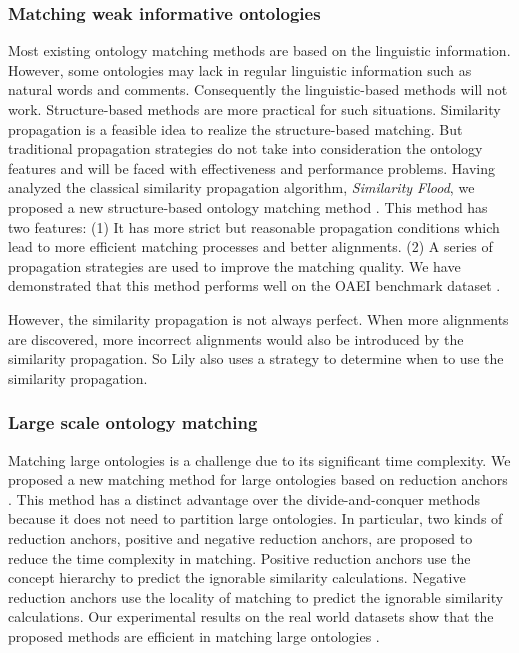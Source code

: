 \documentclass[runningheads]{llncs}
\begin{document}
\subsubsection{Matching weak informative ontologies} Most existing ontology matching methods are based on the linguistic information. However, some ontologies may lack in regular linguistic information such as natural words and comments. Consequently the linguistic-based methods will not work. Structure-based methods are more practical for such situations. Similarity propagation is a feasible idea to realize the structure-based matching. But traditional propagation strategies do not take into consideration the ontology features and will be faced with effectiveness and performance problems. Having analyzed the classical similarity propagation algorithm, \textit{Similarity Flood}, we proposed a new structure-based ontology matching method \cite{wang2009effective}. This method has two features: (1) It has more strict but reasonable propagation conditions which lead to more efficient matching processes and better alignments. (2) A series of propagation strategies are used to improve the matching quality. We have demonstrated that this method performs well on the OAEI benchmark dataset \cite{wang2009effective}. \par
However, the similarity propagation is not always perfect. When more alignments are discovered, more incorrect alignments would also be introduced by the similarity propagation. So Lily also uses a strategy to determine when to use the similarity propagation. \par
\subsubsection{Large scale ontology matching} Matching large ontologies is a challenge due to its significant time complexity. We proposed a new matching method for large ontologies based on reduction anchors \cite{lom_redanc}. This method has a distinct advantage over the divide-and-conquer methods because it does not need to partition large ontologies. In particular, two kinds of reduction anchors, positive and negative reduction anchors, are proposed to reduce the time complexity in matching. Positive reduction anchors use the concept hierarchy to predict the ignorable similarity calculations. Negative reduction anchors use the locality of matching to predict the ignorable similarity calculations. Our experimental results on the real world datasets show that the proposed methods are efficient in matching large ontologies \cite{lom_redanc}. \par
\end{document}
